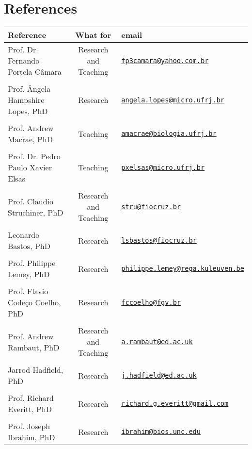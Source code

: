 \documentclass[10pt]{article}
\newcommand\VRule{\color{lightgray}\vrule width 0.5pt}
\begin{document}
\section*{References}
\begin{tabular}{lcl}%
\toprule
Reference & What for & email \\
\midrule
Prof. Dr. Fernando Portela C\^amara& Research and Teaching & \href{mailto:fp3camara@yahoo.com.br}{\nolinkurl{fp3camara@yahoo.com.br}}\\
\\
Prof. \^Angela Hampshire Lopes, PhD & Research & \href{mailto:angela.lopes@micro.ufrj.br}{\nolinkurl{angela.lopes@micro.ufrj.br}}\\
\\
Prof. Andrew Macrae, PhD&Teaching & \href{mailto:amacrae@biologia.ufrj.br}{\nolinkurl{amacrae@biologia.ufrj.br}}\\
\\
Prof. Dr. Pedro Paulo Xavier Elsas & Teaching & \href{mailto:pxelsas@micro.ufrj.br}{\nolinkurl{pxelsas@micro.ufrj.br}}\\
\\
Prof. Claudio Struchiner, PhD & Research and Teaching &  \href{mailto:stru@fiocruz.br}{\nolinkurl{stru@fiocruz.br}} \\
\\
Leonardo Bastos, PhD &Research&  \href{mailto:lsbastos@fiocruz.br}{\nolinkurl{lsbastos@fiocruz.br}} \\
\\
Prof. Philippe Lemey, PhD & Research & \href{mailto:philippe.lemey@rega.kuleuven.be}{\nolinkurl{philippe.lemey@rega.kuleuven.be}}\\
\\
Prof. Flavio Code\c{c}o Coelho, PhD & Research & \href{mailto:fccoelho@fgv.br}{\nolinkurl{fccoelho@fgv.br}}\\
\\
Prof. Andrew Rambaut, PhD & Research and Teaching & \href{mailto:a.rambaut@ed.ac.uk }{\nolinkurl{a.rambaut@ed.ac.uk}}\\
\\
Jarrod Hadfield, PhD & Research & \href{mailto:j.hadfield@ed.ac.uk }{\nolinkurl{j.hadfield@ed.ac.uk}}\\
\\
Prof. Richard Everitt, PhD & Research & \href{mailto:richard.g.everitt@gmail.com}{\nolinkurl{richard.g.everitt@gmail.com}}\\
\\
Prof. Joseph Ibrahim, PhD & Research & \href{mailto:ibrahim@bios.unc.edu}{\nolinkurl{ibrahim@bios.unc.edu}}\\
\bottomrule
\end{tabular}
\end{document}
